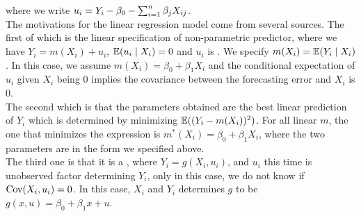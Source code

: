 where we write $u_i = Y_i - \beta_0 - \sum_{i = 1}^{n} \beta_j X_{ij}$. \\
The motivations for the linear regression model come from several sources. The first of which is the linear specification of non-parametric predictor, where we have $Y_i = m(X_i) + u_i$, $\mathbb{E}(u_i \mid X_i) = 0$ and $u_i$ is . We specify $m(X_i) = \mathbb{E}(Y_i \mid X_i)$. In this case, we assume $m(X_i) = \beta_0 + \beta_1X_i$ and the conditional expectation of $u_i$ given $X_i$ being $0$ implies the covariance between the forecasting error and $X_i$ is $0$. \\
The second which is that the parameters obtained are the best linear prediction of $Y_i$ which is determined by minimizing $\mathbb{E}((Y_i - m(X_i))^2)$. For all linear $m$, the one that minimizes the expression is $m^*(X_i) = \beta_0 + \beta_1 X_i$, where the two parameters are in the form we specified above. \\
The third one is that it is a , where $Y_i = g(X_i, u_i)$, and $u_i$ this time is unobserved factor determining $Y_i$, only in this case, we do not know if $\text{Cov}(X_i, u_i) = 0$. In this case, $X_i$ and $Y_i$ determines $g$ to be $g(x, u) = \beta_0 + \beta_1 x + u$.

